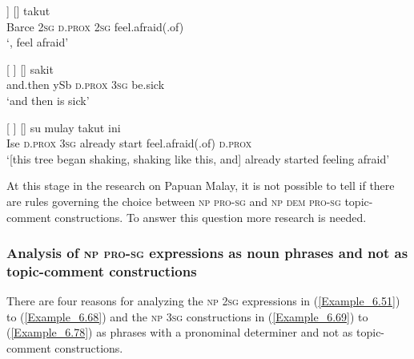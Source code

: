 \ea
\label{Example_6.83}
\gll {[\bluebold{Barce}} {} {]} {[]} {takut}\\ %
 Barce  \textsc{2sg}  \textsc{d.prox}  \textsc{2sg}  feel.afraid(.of)\\

\glt
‘,  feel afraid’ \textstyleExampleSource{[081109-001-Cv.0131]}
\z

\ea
\label{Example_6.84}
 {[} {]} {[]} {sakit}\\ %
 and.then  ySb  \textsc{d.prox}  \textsc{3sg}  be.sick\\

\glt
‘and then  is sick’ \textstyleExampleSource{[080917-002-Cv.0020]}
\z

\ea
\label{Example_6.85}
\gll {\ldots} {[} {]} {[]} {su} {mulay} {takut} {ini}\\ %
 { }  Ise  \textsc{d.prox}  \textsc{3sg}  already  start  feel.afraid(.of)  \textsc{d.prox}\\

\glt
‘[this tree began shaking, shaking like this, and]   already started feeling afraid’ \textstyleExampleSource{[080917-008-NP.0028]}
\z



At this stage in the research on Papuan Malay, it is not possible to tell if there are rules governing the choice between \textsc{np} {\textbar} \textsc{pro-sg} and \textsc{np dem} \textsc{pro-sg} topic-comment constructions. To answer this question more research is needed.


\subsubsection[Analysis of \textsc{np} \textsc{pro-sg} expressions as {noun} phrases and not as topic{}-comment constructions]{Analysis of \textsc{np} \textsc{pro-sg} expressions as {noun} phrases and not as topic-comment constructions}
\label{Para_6.2.1.4}
There are four reasons for analyzing the \textsc{np} \textsc{2sg} expressions in (\ref{Example_6.51}) to (\ref{Example_6.68}) and the \textsc{np} \textsc{3sg} constructions in (\ref{Example_6.69}) to (\ref{Example_6.78}) as  phrases with a pronominal determiner and not as topic-comment constructions.



